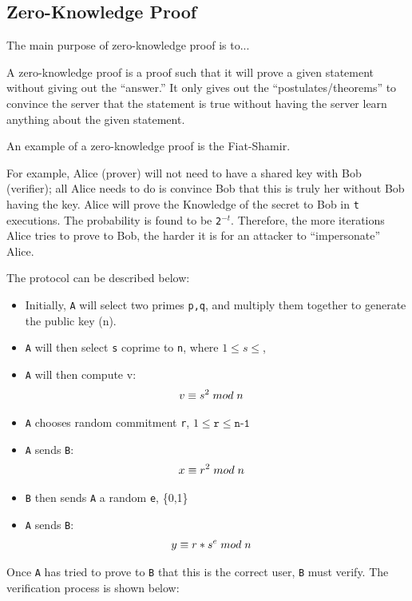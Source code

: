 \documentclass[10pt]{article}
\begin{document}
\subsection{Zero-Knowledge Proof}
The main purpose of zero-knowledge proof is to...

A zero-knowledge proof is a proof such that it will prove a given statement
without giving out the ``answer.'' It only gives out the
``postulates/theorems'' to convince the server that the statement is true
without having the server learn anything about the given statement.

An example of a zero-knowledge proof is the Fiat-Shamir.

For example, Alice (prover) will not need to have a shared key with Bob
(verifier); all Alice needs to do is convince Bob that this is truly her
without Bob having the key. Alice will prove the Knowledge of the secret
to Bob in \texttt{t} executions. The probability is found to be
\texttt{2$^{-t}$}. Therefore, the more iterations Alice tries to prove
to Bob, the harder it is for an attacker to ``impersonate'' Alice.

The protocol can be described below:
\begin{itemize}
    \item Initially, \texttt{A} will select two primes \texttt{p,q}, and multiply them together to generate the public key (n).
    \item \texttt{A} will then select \texttt{s} coprime to \texttt{n}, where $1 \leq s \leq$,
    \item \texttt{A} will then compute v:
        \begin{align*}
            v &\equiv s^{2} \thickspace mod \thickspace n
        \end{align*}
    \item \texttt{A} chooses random commitment \texttt{r}, $1 \leq \texttt{r} \leq \texttt{n-1}$
    \item \texttt{A} sends \texttt{B}:
        \begin{align*}
            x &\equiv r^{2} \thickspace mod \thickspace n
        \end{align*}
    \item \texttt{B} then sends \texttt{A} a random \texttt{e}, \{0,1\}
    \item \texttt{A} sends \texttt{B}:
        \begin{align*}
            y &\equiv r*s^{e} \thickspace mod \thickspace n
        \end{align*}
\end{itemize}
Once \texttt{A} has tried to prove to \texttt{B} that this is the correct user, \texttt{B} must verify.
The verification process is shown below:
\end{document}
